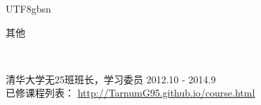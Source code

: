 \documentclass[9pt]{article}
\newenvironment{changemargin}[2]{%
  \begin{list}{}{%
    \setlength{\topsep}{0pt}%
    \setlength{\leftmargin}{#1}%
    \setlength{\rightmargin}{#2}%
    \setlength{\listparindent}{\parindent}%
    \setlength{\itemindent}{\parindent}%
    \setlength{\parsep}{\parskip}%
  }%
  \item[]}{\end{list}
}
\newcommand{\lineover}{
	\begin{changemargin}{-0.05in}{-0.05in}
		\vspace*{-8pt}
		\hrulefill \\
		\vspace*{-2pt}
	\end{changemargin}
}
\newcommand{\header}[1]{
	\begin{changemargin}{-0.5in}{-0.5in}
		\scshape{#1}\\
  	\lineover
	\end{changemargin}
}
\newenvironment{body} {
	\vspace*{-16pt}
	\begin{changemargin}{-0.25in}{-0.5in}
  }	
	{\end{changemargin}
}
\begin{document}
\begin{CJK*}{UTF8}{gbsn}



\header{其他}

\begin{body}
	\vspace{14pt}
	清华大学无25班班长，学习委员 \hfill 2012.10 - 2014.9\\
	\smallskip
	已修课程列表： \href{tarnumg95.github.io/course.html}{http://TarnumG95.github.io/course.html}\\


\end{body}

\smallskip
\smallskip

\end{CJK*}
\end{document}
